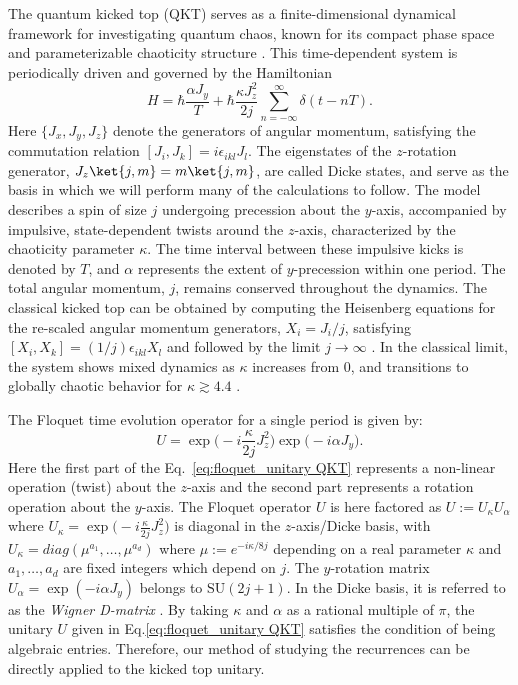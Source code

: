 \documentclass[a4paper,onecolumn,accepted=2026-04-08,10pt]{quantumarticle}
\theoremstyle{definition}
\begin{document}
The quantum kicked top (QKT) serves as a finite-dimensional dynamical framework for investigating quantum chaos, known for its compact phase space and parameterizable chaoticity structure \cite{haake_1987}. This time-dependent system is periodically driven and governed by the Hamiltonian
\begin{equation}\label{eq:QKT_Hamiltonian}
 H = \hbar\frac{\alpha J_{y}}{T} +  \hbar \frac{\kappa J_{z}^2}{2j} \sum_{n=-\infty}^{\infty} \delta (t-nT).
\end{equation}
Here $\{J_{x}, J_{y}, J_{z}\}$ denote the generators of angular momentum, satisfying the commutation relation $[J_i, J_k] = i\epsilon_{ikl} J_l$.  The eigenstates of the $z$-rotation generator, $J_z\ket{j,m} = m\ket{j,m}$, are called Dicke states, and serve as the basis in which we will perform many of the calculations to follow.  The model describes a spin of size $j$ undergoing precession about the $y$-axis, accompanied by impulsive, state-dependent twists around the $z$-axis, characterized by the chaoticity parameter $\kappa$. The time interval between these impulsive kicks is denoted by $T$, and $\alpha$ represents the extent of $y$-precession within one period. The total angular momentum, $j$, remains conserved throughout the dynamics. The classical kicked top can be obtained by computing the Heisenberg equations for the re-scaled angular momentum generators, $X_{i}=J_i/j$, satisfying $[X_i, X_k] = (1/j)\epsilon_{ikl} X_l$ and followed by the limit $j \to \infty$ \cite{haake_1987}. In the classical limit, the system shows mixed dynamics as $\kappa$ increases from 0, and transitions to globally chaotic behavior for $\kappa \gtrsim 4.4$ \cite{kumari_2019_quantumclassical}. 

 
The Floquet time evolution operator for a single period is given by:
\begin{equation}\label{eq:floquet_unitary QKT}
    U = \exp\Big(-i\frac{\kappa }{2j}J_{z}^2\Big) \exp\Big(-i\alpha J_{y}\Big).
\end{equation}
Here the first part of the Eq.\ \eqref{eq:floquet_unitary QKT} represents a non-linear operation (twist) about the $z$-axis and the second part represents a rotation operation about the $y$-axis. The Floquet operator $U$ is here factored as $U := U_{\kappa} U_{\alpha}$ where $U_{\kappa} = \exp\Big(-i\frac{\kappa }{2j}J_{z}^2\Big)$ is diagonal in the $z$-axis/Dicke basis, with $U_{\kappa} = diag(\mu^{a_1}, \ldots, \mu^{a_d})$ where $\mu := e^{-i \kappa/8j}$ depending on a real parameter $\kappa$ and $a_{1}, \ldots, a_{d}$ are fixed integers which depend on $j$. The $y$-rotation matrix $U_{\alpha} = \exp(-i\alpha J_{y})$ belongs to $\mathrm{SU}(2j+1)$. In the Dicke basis, it is referred to as the \textit{Wigner D-matrix} \cite{Biedenharn_Louck_Carruthers_1984}. By taking $\kappa$ and $\alpha$ as a rational multiple of $\pi$, the unitary $U$ given in Eq.\eqref{eq:floquet_unitary QKT} satisfies the condition of being algebraic entries. Therefore, our method of studying the recurrences can be directly applied to the kicked top unitary. 
\end{document}
